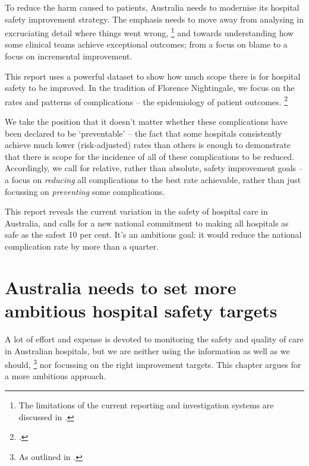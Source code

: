 \documentclass[FrontPage]{grattan}
\begin{document}
To reduce the harm caused to patients, Australia needs to modernise its hospital safety improvement strategy.
The emphasis needs to \linebreak\vfill\null\eject
move away from analysing in excruciating detail where things went wrong,%
	\footnote{The limitations of the current reporting and investigation systems are discussed in .}
and towards understanding how some clinical teams achieve exceptional outcomes; from a focus on blame to a focus on incremental improvement.

This report uses a powerful dataset to show how much scope there is for hospital safety to be improved.
In the tradition of Florence Nightingale, we focus on the rates and patterns of complications -- the epidemiology of patient outcomes.%
	\footcite{Florence-1999}

We take the position that it doesn't matter whether these complications have been declared to be `preventable' -- the fact that some hospitals consistently achieve much lower (risk-adjusted) rates than others is enough to demonstrate that there is scope for the incidence of all of these complications to be reduced.
Accordingly, we call for relative, rather than absolute, safety improvement goals -- a focus on \emph{reducing} all complications to the best rate achievable, rather than just focussing on \emph{preventing} some complications.

This report reveals the current variation in the safety of hospital care in Australia, and calls for a new national commitment to making all hospitals as safe as the safest 10 per cent.
It's an ambitious goal: it would reduce the national complication rate by more than a quarter.


\chapter{Australia needs to set more ambitious hospital safety targets}\label{chap:australia-needs-to-set-more-ambitious-hospital-safety-targets}

A lot of effort and expense is devoted to monitoring the safety and quality of care in Australian hospitals, but we are neither using the information as well as we should,%
	\footnote{As outlined in .}
nor focussing on the right improvement targets.
This chapter argues for a more ambitious approach.
\end{document}
